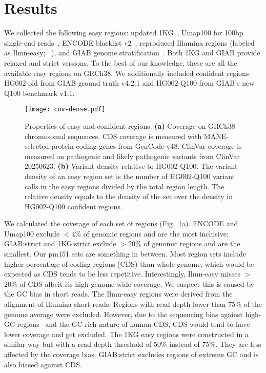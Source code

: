 \documentclass[webpdf,contemporary,large,namedate]{oup-authoring-template}%
\begin{document}
\section{Results}

We collected the following easy regions:
updated {\sf 1KG}~\citep{1000-Genomes-Project-Consortium:2010qc},
{\sf Umap100} for 100bp single-end reads~\citep{Karimzadeh:2018aa},
{\sf ENCODE} blacklist v2~\citep{Amemiya:2019aa},
reproduced Illumina regions (labeled as {\sf Ilmn-easy}; ~\citealp{Aganezov:2022aa}),
and {\sf GIAB} genome stratification~\citep{Dwarshuis:2024aa}.
Both {\sf 1KG} and {\sf GIAB} provide relaxed and strict versions.
To the best of our knowledge, these are all the available easy regions on GRCh38.
We additionally included confident regions {\sf HG002-old} from GIAB ground truth v4.2.1
and {\sf HG002-Q100} from GIAB's new Q100 benchmark v1.1.

\begin{figure}[tb]
\centering
\texttt{[image: cov-dense.pdf]}
\caption{Properties of easy and confident regions.
{\bf (a)} Coverage on GRCh38 chromosomal sequences.
CDS coverage is measured with MANE-selected protein coding genes from GenCode v48.
ClinVar coverage is measured on pathogenic and likely pathogenic variants from ClinVar 20250623.
{\bf (b)} Variant density relative to HG002-Q100.
The variant density of an easy region set is the number of HG002-Q100 variant calls in the easy regions divided by the total region length.
The relative density equals to the density of the set over the density in HG002-Q100 confident regions.
}\label{fig:cov}
\end{figure}

We calculated the coverage of each set of regions (Fig.~\ref{fig:cov}a).
ENCODE and Umap100 exclude $<$4\% of genomic regions and are the most inclusive;
GIAB:strict and 1KG:strict exclude $>$20\% of genomic regions and are the smallest.
Our pm151 sets are something in between.
Most region sets include higher percentage of coding regions (CDS) than whole genome, which would be expected as CDS tends to be less repetitive.
Interestingly, Ilmn-easy misses $>$20\% of CDS albeit its high genome-wide coverage.
We suspect this is caused by the GC bias in short reads.
The Ilmn-easy regions were derived from the alignment of Illumina short reads.
Regions with read depth lower than 75\% of the genome average were excluded.
However, due to the sequencing bias against high-GC regions~\citep{Benjamini:2012aa} and the GC-rich nature of human CDS,
CDS would tend to have lower coverage and get excluded.
The 1KG easy regions were constructed in a similar way but with a read-depth threshold of 50\% instead of 75\%.
They are less affected by the coverage bias.
GIAB:strict excludes regions of extreme GC and is also biased against CDS.
\end{document}

